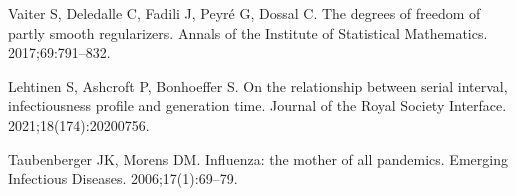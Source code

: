\documentclass[10pt,letterpaper]{article}
\begin{document}
\begin{thebibliography}{10}
  Vaiter S, Deledalle C, Fadili J, Peyr{\'e} G, Dossal C.
  \newblock The degrees of freedom of partly smooth regularizers.
  \newblock Annals of the Institute of Statistical Mathematics. 2017;69:791--832.
  
  Lehtinen S, Ashcroft P, Bonhoeffer S.
  \newblock On the relationship between serial interval, infectiousness profile
    and generation time.
  \newblock Journal of the Royal Society Interface. 2021;18(174):20200756.
  
  Taubenberger JK, Morens DM.
   {I}nfluenza: the mother of all pandemics.
  \newblock Emerging Infectious Diseases. 2006;17(1):69--79.
  
\end{thebibliography}
\end{document}
